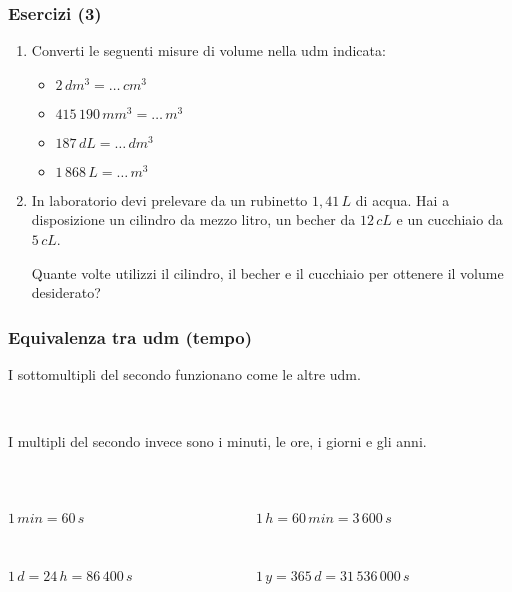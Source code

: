 \documentclass[]{beamer}
\begin{document}
\begin{frame}
\frametitle{Esercizi (3)}
\begin{enumerate}
  \item Converti le seguenti misure di volume nella udm indicata:
  \begin{multicols}{2}
    \begin{itemize}
        \item $ 2 \, dm^3 = \ldots \, cm^3 $
        \item $ 415\,190 \, mm^3 = \ldots \, m^3 $
        \item $ 187 \, dL = \ldots \, dm^3 $
        \item $ 1\,868 \, L = \ldots \, m^3 $
    \end{itemize}
  \end{multicols}
  \item In laboratorio devi prelevare da un rubinetto $ 1,41 \, L $ di acqua. Hai a disposizione un cilindro da mezzo litro, un becher da $ 12 \, cL $ e un cucchiaio da $ 5 \, cL $.
  
  Quante volte utilizzi il cilindro, il becher e il cucchiaio per ottenere il volume desiderato?
\end{enumerate}
\end{frame}




\begin{frame}
\frametitle{Equivalenza tra udm (tempo)}
I sottomultipli del secondo funzionano come le altre udm.

~

I multipli del secondo invece sono i minuti, le ore, i giorni e gli anni.

~

\begin{columns}
\begin{column}{0.4\textwidth}
$ 1 \, min = 60 \, s $

~

$ 1 \, d = 24 \, h = 86\,400 \, s $
\end{column}
\begin{column}{0.4\textwidth}
$ 1 \, h = 60 \, min = 3\,600 \, s $

~

$ 1 \, y = 365 \, d = 31\,536\,000 \, s$
\end{column}
\end{columns}
\end{frame}
\end{document}
